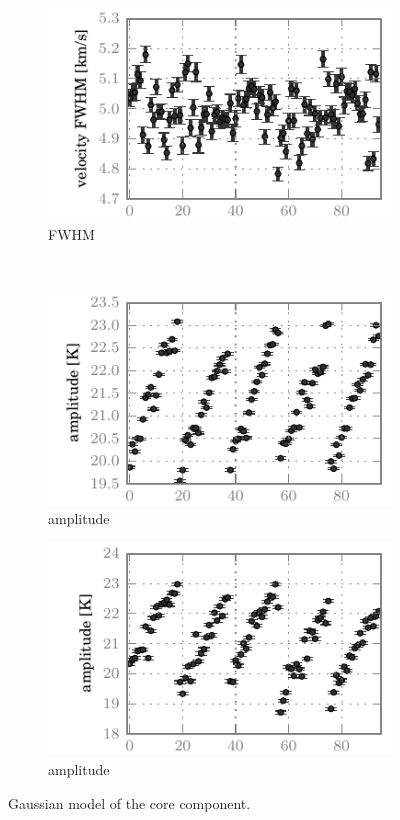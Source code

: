 \begin{figure}[hbtp]
    \begin{subfigure}[b]{0.5\textwidth}
        \includegraphics{co98_core_vfwh}
        \caption{ FWHM}
    \end{subfigure}%
    \\
    \begin{subfigure}[b]{0.5\textwidth}
        \includegraphics{co87_core_ampl}
        \caption{ amplitude}
    \end{subfigure}%
    \begin{subfigure}[b]{0.5\textwidth}
        \includegraphics{co98_core_ampl}
        \caption{ amplitude}
    \end{subfigure}%
    \caption{
        Gaussian model of the core component.
    }
    \label{fig:fit_core}
\end{figure}

